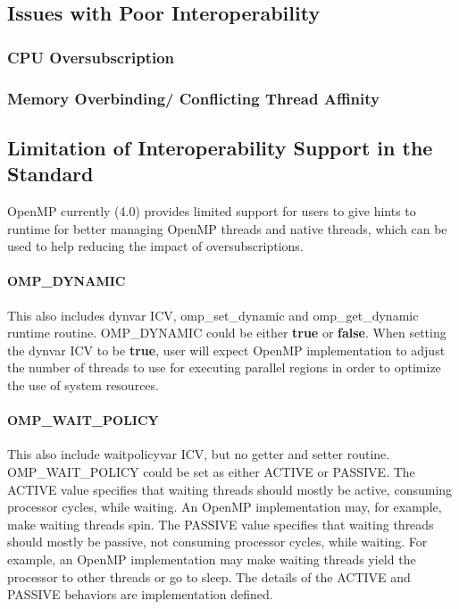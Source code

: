 \subsection{Issues with Poor Interoperability}
\subsubsection{CPU Oversubscription}


\subsubsection{Memory Overbinding/ Conflicting Thread Affinity}


\subsection{Limitation of Interoperability Support in the Standard}
OpenMP currently (4.0) provides limited support for users to give hints to runtime for 
better managing OpenMP threads and native threads, which can be used to help reducing 
the impact of oversubscriptions.
\paragraph{OMP\_DYNAMIC} %
This also includes dynvar ICV, omp\_set\_dynamic and omp\_get\_dynamic runtime routine. OMP\_DYNAMIC could be either
{\bf true} or {\bf false}. When setting the dynvar ICV to be {\bf true}, user will expect
OpenMP implementation to adjust the number of threads to use for executing parallel
regions in order to optimize the use of system resources.

\paragraph{OMP\_WAIT\_POLICY} %
This also include waitpolicyvar ICV, but no getter and setter routine. 
OMP\_WAIT\_POLICY could be set as either ACTIVE or PASSIVE. 
The ACTIVE value specifies that waiting threads should mostly be active, consuming processor
 cycles, while waiting. An OpenMP implementation may, for example, make waiting threads spin.
 The PASSIVE value specifies that waiting threads should mostly be passive, not consuming
 processor cycles, while waiting. For example, an OpenMP implementation may make waiting
 threads yield the processor to other threads or go to sleep.
 The details of the ACTIVE and PASSIVE behaviors are implementation defined.
 
